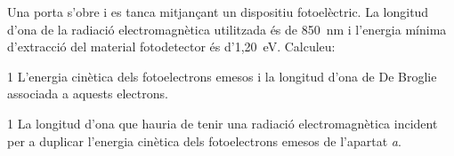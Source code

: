 Una porta s'obre i es tanca mitjançant un dispositiu fotoelèctric. La longitud d'ona de la radiació electromagnètica utilitzada és de 850~nm i l'energia mínima d'extracció del material fotodetector és d'1,20~eV. Calculeu:

\begin{apartat}{1}
L'energia cinètica dels fotoelectrons emesos i la longitud d'ona de De Broglie associada a aquests electrons.
\end{apartat}

\begin{apartat}{1}
La longitud d'ona que hauria de tenir una radiació electromagnètica incident per a duplicar l'energia cinètica dels fotoelectrons emesos de l'apartat \textit{a}.
\end{apartat}

